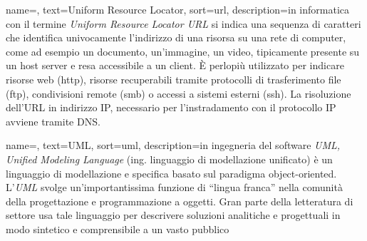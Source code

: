
\renewcommand{\acronymname}{Acronimi e abbreviazioni}




{
    name=,
    text=Uniform Resource Locator,
    sort=url,
    description={in informatica con il termine \emph{Uniform Resource Locator URL} si indica una sequenza di caratteri che identifica univocamente l'indirizzo di una risorsa su una rete di computer, come ad esempio un documento, un'immagine, un video, tipicamente presente su un host server e resa accessibile a un client. È perlopiù utilizzato per indicare risorse web (http), risorse recuperabili tramite protocolli di trasferimento file (ftp), condivisioni remote (smb) o accessi a sistemi esterni (ssh). La risoluzione dell'URL in indirizzo IP, necessario per l'instradamento con il protocollo IP avviene tramite DNS. }
}

{
    name=,
    text=UML,
    sort=uml,
    description={in ingegneria del software \emph{UML, Unified Modeling Language} (ing. linguaggio di modellazione unificato) è un linguaggio di modellazione e specifica basato sul paradigma object-oriented. L'\emph{UML} svolge un'importantissima funzione di ``lingua franca'' nella comunità della progettazione e programmazione a oggetti. Gran parte della letteratura di settore usa tale linguaggio per descrivere soluzioni analitiche e progettuali in modo sintetico e comprensibile a un vasto pubblico}
}

